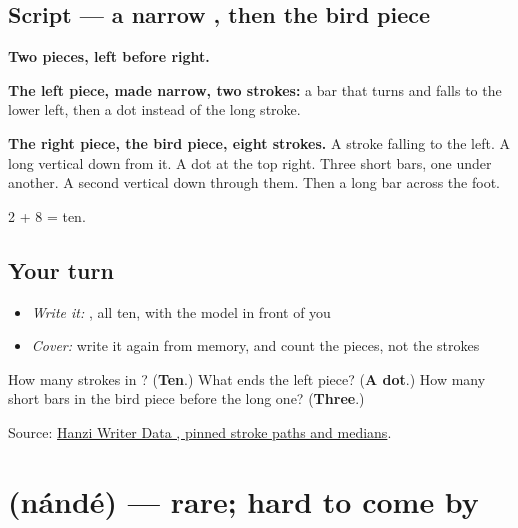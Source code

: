 \subsection*{Script — a narrow , then the bird piece}

\begin{quote}
\end{quote}

\textbf{Two pieces, left before right.}

\textbf{The left piece,  made narrow, two strokes:} a bar that turns and falls to the lower left, then a dot instead of the long stroke.

\textbf{The right piece, the bird piece, eight strokes.} A stroke falling to the left. A long vertical down from it. A dot at the top right. Three short bars, one under another. A second vertical down through them. Then a long bar across the foot.

2 + 8 = ten.

\subsection*{Your turn}
\begin{itemize}
\raggedright
  \item \emph{Write it:} , all ten, with the model in front of you
  \item \emph{Cover:} write it again from memory, and count the pieces, not the strokes
\end{itemize}

\begin{tcolorbox}[breakable,colback=teal!4,colframe=teal!35!black,title={Before you move on}]
How many strokes in ? (\textbf{Ten}.) What ends the left piece? (\textbf{A dot}.) How many short bars in the bird piece before the long one? (\textbf{Three}.)

Source: \href{https://raw.githubusercontent.com/chanind/hanzi-writer-data/68d10a4b21150cae5e1ebbd223eed289cf32d90c/data/\%E9\%9A\%BE.json}{Hanzi Writer Data , pinned stroke paths and medians}.
\end{tcolorbox}
\section[\texorpdfstring{\zh{难得} (nándé)}{难得 (nándé)}]{ (nándé) — rare; hard to come by}

